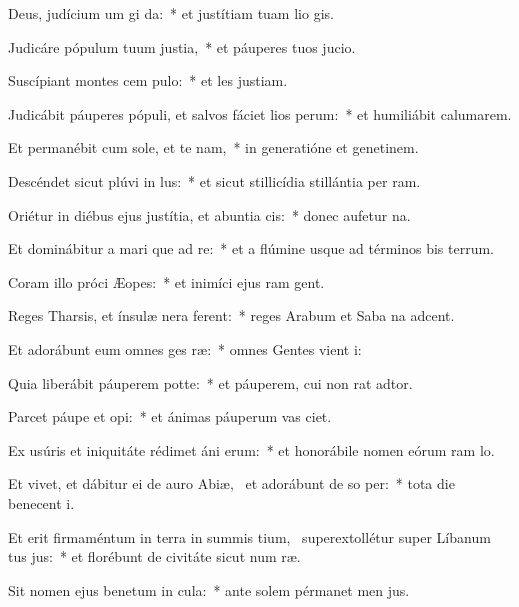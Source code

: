 \item Deus, judícium um gi da:~* et justítiam tuam lio gis.
\item Judicáre pópulum tuum  justia,~* et páuperes tuos  jucio.
\item Suscípiant montes cem pulo:~* et les justiam.
\item Judicábit páuperes pópuli, et salvos fáciet lios perum:~* et humiliábit calumarem.
\item Et permanébit cum sole, et te nam,~* in generatióne et genetinem.
\item Descéndet sicut plúvi in lus:~* et sicut stillicídia stillántia per ram.
\item Oriétur in diébus ejus justítia, et abuntia cis:~* donec aufetur na.
\item Et dominábitur a mari que ad re:~* et a flúmine usque ad términos bis terrum.
\item Coram illo próci Æopes:~* et inimíci ejus ram gent.
\item Reges Tharsis, et ínsulæ nera ferent:~* reges Arabum et Saba na adcent.
\item Et adorábunt eum omnes ges ræ:~* omnes Gentes vient i:
\item Quia liberábit páuperem  potte:~* et páuperem, cui non rat adtor.
\item Parcet páupe et opi:~* et ánimas páuperum vas ciet.
\item Ex usúris et iniquitáte rédimet áni erum:~* et honorábile nomen eórum ram lo.
\item Et vivet, et dábitur ei de auro Abiæ,~\pscross{} et adorábunt de so per:~* tota die benecent i.
\item Et erit firmaméntum in terra in summis tium,~\pscross{} superextollétur super Líbanum tus jus:~* et florébunt de civitáte sicut num ræ.
\item Sit nomen ejus benetum in cula:~* ante solem pérmanet men jus.
